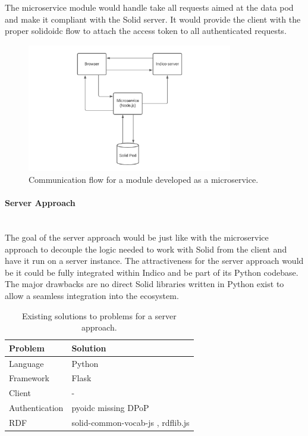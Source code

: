 The microservice module would handle take all requests aimed at the data pod and make it compliant with the Solid server. It would provide the client with the proper \gls{solidoidc} flow to attach the access token to all authenticated requests.

\begin{figure}[H]
    \centering
    \includegraphics[width=0.8\textwidth]{prototype/graphs/poc-infrastructure-microservice.jpeg}
    \caption{Communication flow for a module developed as a microservice.}
    \label{fig:poc-infrastructure-microservice}
\end{figure}
\vspace{0.5cm}
\paragraph{Server Approach}\mbox{}\\

The goal of the server approach would be just like with the microservice approach to decouple the logic needed to work with Solid from the client and have it run on a server instance. The attractiveness for the server approach would be it could be fully integrated within Indico and be part of its Python codebase. The major drawbacks are no direct Solid libraries written in Python exist to allow a seamless integration into the ecosystem.

\begin{table}[!ht]
    \centering
    \begin{tabular}{| l | l |} 
    \hline
     Problem & Solution \\
     \hline
      Language & Python  \\
      Framework & Flask  \\
      Client & -  \\
      Authentication & pyoidc \cite{pyoidc} missing DPoP\\
      RDF & solid-common-vocab-js \cite{solid-common-vocab-js}, rdflib.js \cite{rdflib.js}  \\
    \hline
    \end{tabular}
    \vspace{0.75cm}
    \caption{Existing solutions to problems for a server approach.}
    \label{table:3}
\end{table}

